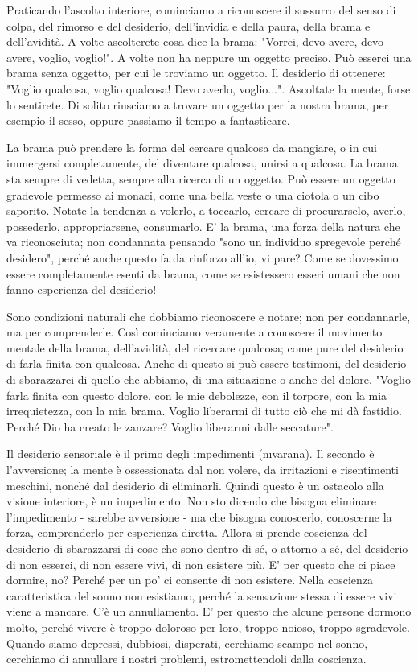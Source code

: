 
Praticando l'ascolto interiore, cominciamo a riconoscere il sussurro del
senso di colpa, del rimorso e del desiderio, dell'invidia e della paura,
della brama e dell'avidità. A volte ascolterete cosa dice la brama:
"Vorrei, devo avere, devo avere, voglio, voglio!". A volte non ha
neppure un oggetto preciso. Può esserci una brama senza oggetto, per cui
le troviamo un oggetto. Il desiderio di ottenere: "Voglio qualcosa,
voglio qualcosa! Devo averlo, voglio...". Ascoltate la mente, forse lo
sentirete. Di solito riusciamo a trovare un oggetto per la nostra brama,
per esempio il sesso, oppure passiamo il tempo a fantasticare.

La brama può prendere la forma del cercare qualcosa da mangiare, o in
cui immergersi completamente, del diventare qualcosa, unirsi a qualcosa.
La brama sta sempre di vedetta, sempre alla ricerca di un oggetto. Può
essere un oggetto gradevole permesso ai monaci, come una bella veste o
una ciotola o un cibo saporito. Notate la tendenza a volerlo, a
toccarlo, cercare di procurarselo, averlo, possederlo, appropriarsene,
consumarlo. E' la brama, una forza della natura che va riconosciuta; non
condannata pensando "sono un individuo spregevole perché desidero",
perché anche questo fa da rinforzo all'io, vi pare? Come se dovessimo
essere completamente esenti da brama, come se esistessero esseri umani
che non fanno esperienza del desiderio!

Sono condizioni naturali che dobbiamo riconoscere e notare; non per
condannarle, ma per comprenderle. Così cominciamo veramente a conoscere
il movimento mentale della brama, dell'avidità, del ricercare qualcosa;
come pure del desiderio di farla finita con qualcosa. Anche di questo si
può essere testimoni, del desiderio di sbarazzarci di quello che
abbiamo, di una situazione o anche del dolore. "Voglio farla finita con
questo dolore, con le mie debolezze, con il torpore, con la mia
irrequietezza, con la mia brama. Voglio liberarmi di tutto ciò che mi dà
fastidio. Perché Dio ha creato le zanzare? Voglio liberarmi dalle
seccature".

Il desiderio sensoriale è il primo degli impedimenti (nīvarana). Il
secondo è l'avversione; la mente è ossessionata dal non volere, da
irritazioni e risentimenti meschini, nonché dal desiderio di eliminarli.
Quindi questo è un ostacolo alla visione interiore, è un impedimento.
Non sto dicendo che bisogna eliminare l'impedimento - sarebbe avversione
- ma che bisogna conoscerlo, conoscerne la forza, comprenderlo per
esperienza diretta. Allora si prende coscienza del desiderio di
sbarazzarsi di cose che sono dentro di sé, o attorno a sé, del desiderio
di non esserci, di non essere vivi, di non esistere più. E' per questo
che ci piace dormire, no? Perché per un po' ci consente di non esistere.
Nella coscienza caratteristica del sonno non esistiamo, perché la
sensazione stessa di essere vivi viene a mancare. C'è un annullamento.
E' per questo che alcune persone dormono molto, perché vivere è troppo
doloroso per loro, troppo noioso, troppo sgradevole. Quando siamo
depressi, dubbiosi, disperati, cerchiamo scampo nel sonno, cerchiamo di
annullare i nostri problemi, estromettendoli dalla coscienza.

